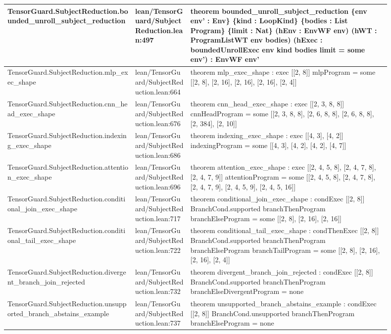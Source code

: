 \documentclass[10pt]{article}
\begin{document}
\begin{longtable}{|p{0.30\linewidth}|p{0.13\linewidth}|p{0.47\linewidth}|}
\hline
TensorGuard.SubjectReduction.bounded\_unroll\_subject\_reduction & lean/TensorGuard/SubjectReduction.lean:497 & theorem bounded\_unroll\_subject\_reduction \{env env' : Env\} \{kind : LoopKind\} \{bodies : List Program\} \{limit : Nat\} (hEnv : EnvWF env) (hWT : ProgramListWT env bodies) (hExec : boundedUnrollExec env kind bodies limit = some env') : EnvWF env' \\
\hline
TensorGuard.SubjectReduction.mlp\_exec\_shape & lean/TensorGuard/SubjectReduction.lean:664 & theorem mlp\_exec\_shape : exec [[2, 8]] mlpProgram = some [[2, 8], [2, 16], [2, 16], [2, 16], [2, 4]] \\
\hline
TensorGuard.SubjectReduction.cnn\_head\_exec\_shape & lean/TensorGuard/SubjectReduction.lean:676 & theorem cnn\_head\_exec\_shape : exec [[2, 3, 8, 8]] cnnHeadProgram = some [[2, 3, 8, 8], [2, 6, 8, 8], [2, 6, 8, 8], [2, 384], [2, 10]] \\
\hline
TensorGuard.SubjectReduction.indexing\_exec\_shape & lean/TensorGuard/SubjectReduction.lean:686 & theorem indexing\_exec\_shape : exec [[4, 3], [4, 2]] indexingProgram = some [[4, 3], [4, 2], [4, 2], [4, 7]] \\
\hline
TensorGuard.SubjectReduction.attention\_exec\_shape & lean/TensorGuard/SubjectReduction.lean:696 & theorem attention\_exec\_shape : exec [[2, 4, 5, 8], [2, 4, 7, 8], [2, 4, 7, 9]] attentionProgram = some [[2, 4, 5, 8], [2, 4, 7, 8], [2, 4, 7, 9], [2, 4, 5, 9], [2, 4, 5, 16]] \\
\hline
TensorGuard.SubjectReduction.conditional\_join\_exec\_shape & lean/TensorGuard/SubjectReduction.lean:717 & theorem conditional\_join\_exec\_shape : condExec [[2, 8]] BranchCond.supported branchThenProgram branchElseProgram = some [[2, 8], [2, 16], [2, 16]] \\
\hline
TensorGuard.SubjectReduction.conditional\_tail\_exec\_shape & lean/TensorGuard/SubjectReduction.lean:722 & theorem conditional\_tail\_exec\_shape : condThenExec [[2, 8]] BranchCond.supported branchThenProgram branchElseProgram branchTailProgram = some [[2, 8], [2, 16], [2, 16], [2, 4]] \\
\hline
TensorGuard.SubjectReduction.divergent\_branch\_join\_rejected & lean/TensorGuard/SubjectReduction.lean:732 & theorem divergent\_branch\_join\_rejected : condExec [[2, 8]] BranchCond.supported branchThenProgram branchElseDivergentProgram = none \\
\hline
TensorGuard.SubjectReduction.unsupported\_branch\_abstains\_example & lean/TensorGuard/SubjectReduction.lean:737 & theorem unsupported\_branch\_abstains\_example : condExec [[2, 8]] BranchCond.unsupported branchThenProgram branchElseProgram = none \\

\end{longtable}
\end{document}
